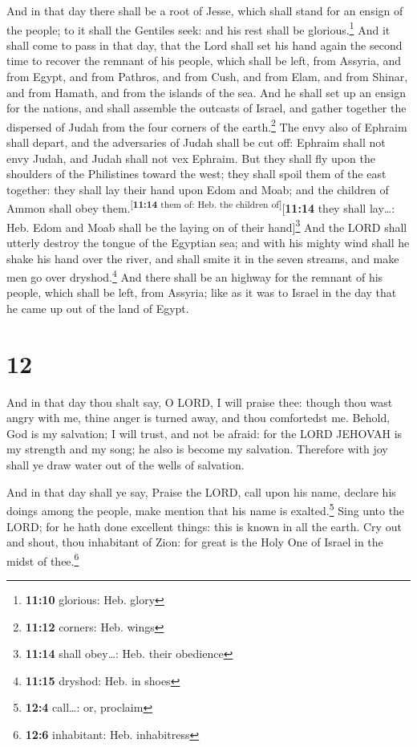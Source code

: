  And in that day there shall be a root of Jesse, which
shall stand for an ensign of the people; to it shall the Gentiles seek:
and his rest shall be glorious.\footnote{\textbf{11:10} glorious: Heb.
  glory}  And it shall come to pass in that day, that the
Lord shall set his hand again the second time to recover the remnant of
his people, which shall be left, from Assyria, and from Egypt, and from
Pathros, and from Cush, and from Elam, and from Shinar, and from Hamath,
and from the islands of the sea.  And he shall set up an
ensign for the nations, and shall assemble the outcasts of Israel, and
gather together the dispersed of Judah from the four corners of the
earth.\footnote{\textbf{11:12} corners: Heb. wings}  The
envy also of Ephraim shall depart, and the adversaries of Judah shall be
cut off: Ephraim shall not envy Judah, and Judah shall not vex Ephraim.
 But they shall fly upon the shoulders of the Philistines
toward the west; they shall spoil them of the east together: they shall
lay their hand upon Edom and Moab; and the children of Ammon shall obey
them.\textsuperscript{{[}\textbf{11:14} them of: Heb. the children
of{]}}{[}\textbf{11:14} they shall lay\ldots: Heb. Edom and Moab shall
be the laying on of their hand{]}\footnote{\textbf{11:14} shall
  obey\ldots: Heb. their obedience}  And the LORD shall
utterly destroy the tongue of the Egyptian sea; and with his mighty wind
shall he shake his hand over the river, and shall smite it in the seven
streams, and make men go over dryshod.\footnote{\textbf{11:15} dryshod:
  Heb. in shoes}  And there shall be an highway for the
remnant of his people, which shall be left, from Assyria; like as it was
to Israel in the day that he came up out of the land of Egypt.

\hypertarget{section-11}{%
\section{12}\label{section-11}}

 And in that day thou shalt say, O LORD, I will praise
thee: though thou wast angry with me, thine anger is turned away, and
thou comfortedst me.  Behold, God is my salvation; I will
trust, and not be afraid: for the LORD JEHOVAH is my strength and my
song; he also is become my salvation.  Therefore with joy
shall ye draw water out of the wells of salvation.

 And in that day shall ye say, Praise the LORD, call upon
his name, declare his doings among the people, make mention that his
name is exalted.\footnote{\textbf{12:4} call\ldots: or, proclaim}
 Sing unto the LORD; for he hath done excellent things:
this is known in all the earth.  Cry out and shout, thou
inhabitant of Zion: for great is the Holy One of Israel in the midst of
thee.\footnote{\textbf{12:6} inhabitant: Heb. inhabitress}

